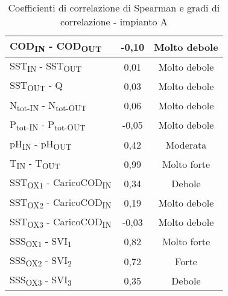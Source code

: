 \begin{table}[]
\begin{center}
\begin{tabular}{|l|c|c|}
		COD\textsubscript{IN} - COD\textsubscript{OUT}                           & -0,10      & Molto debole                                                             \\ \hline
		SST\textsubscript{IN} - SST\textsubscript{OUT}                           & 0,01       & Molto debole                                                             \\ \hline
		SST\textsubscript{OUT} - Q                               & 0,03       & Molto debole                                                             \\ \hline
		N\textsubscript{tot-IN} - N\textsubscript{tot-OUT}                       & 0,06       & Molto debole                                                             \\ \hline
		P\textsubscript{tot-IN} - P\textsubscript{tot-OUT}                       & -0,05      & Molto debole                                                             \\ \hline
		pH\textsubscript{IN} - pH\textsubscript{OUT}                             & 0,42       & Moderata                                                                 \\ \hline
		T\textsubscript{IN} - T\textsubscript{OUT}                               & 0,99       & Molto forte                                                              \\ \hline
		SST\textsubscript{OX1} - CaricoCOD\textsubscript{IN}                     & 0,34       & Debole                                                                   \\ \hline
		SST\textsubscript{OX2} - CaricoCOD\textsubscript{IN}                     & 0,19       & Molto debole                                                             \\ \hline
		SST\textsubscript{OX3} - CaricoCOD\textsubscript{IN}                     & -0,03      & Molto debole                                                             \\ \hline
		SSS\textsubscript{OX1} - SVI\textsubscript{1}                            & 0,82       & Molto forte                                                              \\ \hline
		SSS\textsubscript{OX2} - SVI\textsubscript{2}                            & 0,72       & Forte                                                                    \\ \hline
		SSS\textsubscript{OX3} - SVI\textsubscript{3}                            & 0,35       & Debole                                                                   \\ \hline
	\end{tabular}
	\caption{Coefficienti di correlazione di Spearman e gradi di correlazione - impianto A}
	\label{tab:sa_corr}
\end{center}
\end{table}







